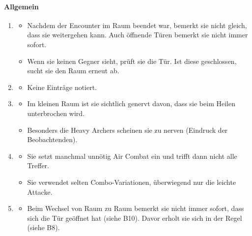 \documentclass[../Main.tex]{subfiles}
\begin{document}
\paragraph{Allgemein}
\begin{enumerate}[label=\textbf{B\arabic*}, leftmargin=1.5cm, itemsep=0.8em, resume]
    \item
        \begin{itemize}[nosep]
            \item Nachdem der Encounter im Raum beendet war, bemerkt sie nicht gleich, dass sie weitergehen kann. Auch öffnende Türen bemerkt sie nicht immer sofort.
            \item Wenn sie keinen Gegner sieht, prüft sie die Tür. Ist diese geschlossen, sucht sie den Raum erneut ab.
        \end{itemize}

    \item
        \begin{itemize}[nosep]
            \item Keine Einträge notiert.
        \end{itemize}

    \item
        \begin{itemize}[nosep]
            \item Im kleinen Raum ist sie sichtlich genervt davon, dass sie beim Heilen unterbrochen wird.
            \item Besonders die Heavy Archers scheinen sie zu nerven (Eindruck der Beobachtenden).
        \end{itemize}

    \item
        \begin{itemize}[nosep]
            \item Sie setzt manchmal unnötig Air Combat ein und trifft dann nicht alle Treffer.
            \item Sie verwendet selten Combo-Variationen, überwiegend nur die leichte Attacke.
        \end{itemize}

    \item
        \begin{itemize}[nosep]
            \item Beim Wechsel von Raum zu Raum bemerkt sie nicht immer sofort, dass sich die Tür geöffnet hat (siehe B10). Davor erholt sie sich in der Regel (siehe B8).
        \end{itemize}
\end{enumerate}
\end{document}
